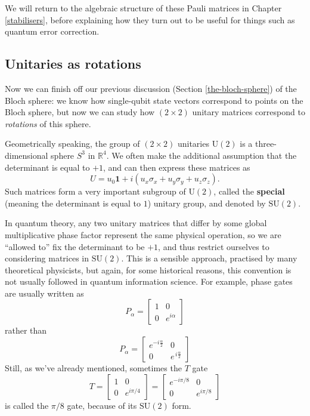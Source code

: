 \documentclass[fleqn]{article}
\begin{document}
We will return to the algebraic structure of these Pauli matrices in Chapter \ref{stabilisers}, before explaining how they turn out to be useful for things such as quantum error correction.

\hypertarget{unitaries-as-rotations}{%
\subsection{Unitaries as rotations}\label{unitaries-as-rotations}}

Now we can finish off our previous discussion (Section \ref{the-bloch-sphere}) of the Bloch sphere: we know how single-qubit state vectors correspond to points on the Bloch sphere, but now we can study how \((2\times 2)\) unitary matrices correspond to \emph{rotations} of this sphere.

Geometrically speaking, the group of \((2\times2)\) unitaries \(\mathrm{U}(2)\) is a three-dimensional sphere \(S^3\) in \(\mathbb{R}^4\).
We often make the additional assumption that the determinant is equal to \(+1\), and can then express these matrices as
\[
  U = u_0\mathbf{1}+ i(u_x\sigma_x + u_y\sigma_y + u_z\sigma_z).
\]
Such matrices form a very important subgroup of \(\mathrm{U}(2)\), called the \textbf{special} (meaning the determinant is equal to \(1\)) unitary group, and denoted by \(\mathrm{SU}(2)\).

In quantum theory, any two unitary matrices that differ by some global multiplicative phase factor represent the same physical operation, so we are ``allowed to'' fix the determinant to be \(+1\), and thus restrict ourselves to considering matrices in \(\mathrm{SU}(2)\).
This is a sensible approach, practised by many theoretical physicists, but again, for some historical reasons, this convention is not usually followed in quantum information science.
For example, phase gates are usually written as
\[
  P_\alpha = \begin{bmatrix}1&0\\0&e^{i\alpha}\end{bmatrix}
\]
rather than
\[
  P_\alpha = \begin{bmatrix}e^{-i\frac{\alpha}{2}}&0\\0&e^{\,i\frac{\alpha}{2}}\end{bmatrix}
\]
Still, as we've already mentioned, sometimes the \(T\) gate
\[
  T
  = \begin{bmatrix}1&0\\0&e^{i\pi/4}\end{bmatrix}
  = \begin{bmatrix}e^{-i\pi/8}&0\\0&e^{i\pi/8}\end{bmatrix}
\]
is called the \(\pi/8\) gate, because of its \(\mathrm{SU}(2)\) form.
\end{document}
